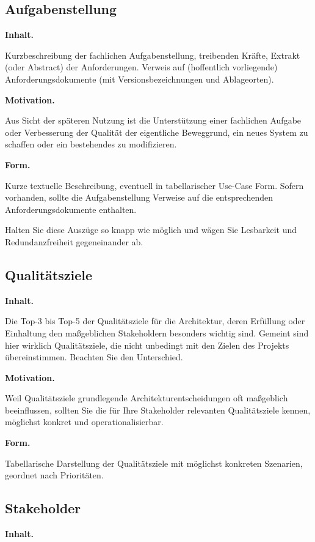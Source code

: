 \documentclass[]{article}
\begin{document}
\hypertarget{_aufgabenstellung}{%
\subsection{Aufgabenstellung}\label{_aufgabenstellung}}

\textbf{Inhalt.}

Kurzbeschreibung der fachlichen Aufgabenstellung, treibenden Kräfte,
Extrakt (oder Abstract) der Anforderungen. Verweis auf (hoffentlich
vorliegende) Anforderungsdokumente (mit Versionsbezeichnungen und
Ablageorten).

\textbf{Motivation.}

Aus Sicht der späteren Nutzung ist die Unterstützung einer fachlichen
Aufgabe oder Verbesserung der Qualität der eigentliche Beweggrund, ein
neues System zu schaffen oder ein bestehendes zu modifizieren.

\textbf{Form.}

Kurze textuelle Beschreibung, eventuell in tabellarischer Use-Case Form.
Sofern vorhanden, sollte die Aufgabenstellung Verweise auf die
entsprechenden Anforderungsdokumente enthalten.

Halten Sie diese Auszüge so knapp wie möglich und wägen Sie Lesbarkeit
und Redundanzfreiheit gegeneinander ab.

\hypertarget{_qualit_tsziele}{%
\subsection{Qualitätsziele}\label{_qualit_tsziele}}

\textbf{Inhalt.}

Die Top-3 bis Top-5 der Qualitätsziele für die Architektur, deren
Erfüllung oder Einhaltung den maßgeblichen Stakeholdern besonders
wichtig sind. Gemeint sind hier wirklich Qualitätsziele, die nicht
unbedingt mit den Zielen des Projekts übereinstimmen. Beachten Sie den
Unterschied.

\textbf{Motivation.}

Weil Qualitätsziele grundlegende Architekturentscheidungen oft
maßgeblich beeinflussen, sollten Sie die für Ihre Stakeholder relevanten
Qualitätsziele kennen, möglichst konkret und operationalisierbar.

\textbf{Form.}

Tabellarische Darstellung der Qualitätsziele mit möglichst konkreten
Szenarien, geordnet nach Prioritäten.

\hypertarget{_stakeholder}{%
\subsection{Stakeholder}\label{_stakeholder}}
\textbf{Inhalt.}
\end{document}

